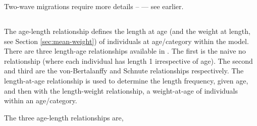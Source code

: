 Two-wave migrations require more details \mbox{--} — see earlier.





\paragraph{}

\paragraph{}

\subsection{\label{sec:derived-quantities}}

\subsection{\label{sec:age-at-age}}

The age-length relationship defines the length at age (and the weight at length, see Section \ref{sec:mean-weight}) of individuals at age/category within the model. There are three length-age relationships available in \CAS. The first is the naive no relationship (where each individual has length 1 irrespective of age). The second  and third are the von-Bertalanffy and Schnute relationships respectively. The length-at-age relationship is used to determine the length frequency, given age, and then with the length-weight relationship, a weight-at-age of individuals within an age/category. 

The three age-length relationships are,

